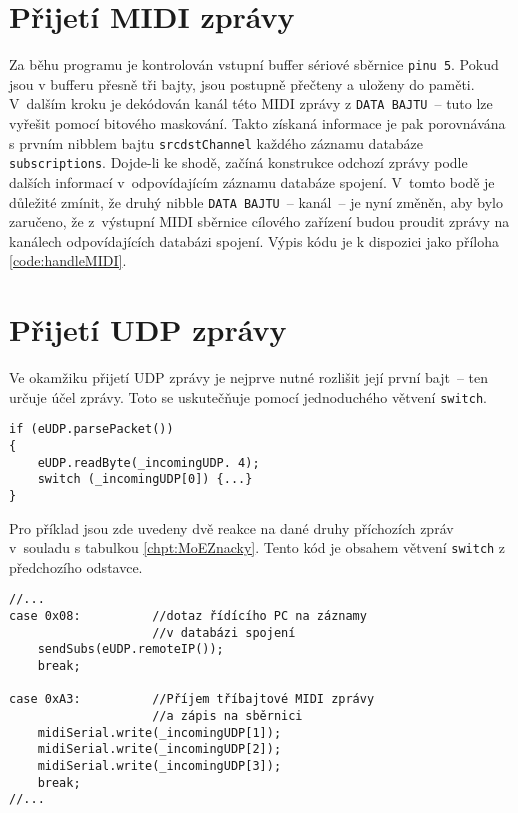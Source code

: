 \section{Přijetí \acs{MIDI} zprávy}\label{chpt:PrijMIDI}
Za běhu programu je kontrolován vstupní buffer sériové sběrnice \texttt{pinu~5}. Pokud jsou v bufferu přesně tři bajty, jsou postupně přečteny a uloženy do paměti. V~dalším kroku je dekódován kanál této \acs{MIDI} zprávy z \texttt{DATA BAJTU}~-- tuto  lze vyřešit pomocí bitového maskování. Takto získaná informace je pak porovnávána s prvním nibblem bajtu \texttt{srcdstChannel} každého záznamu databáze \texttt{sub\-scrip\-tions}. Dojde-li ke shodě, začíná konstrukce odchozí zprávy podle dalších informací v~odpovídajícím záznamu databáze spojení. V~tomto bodě je důležité zmínit, že druhý nibble \texttt{DATA BAJTU}~-- kanál~-- je nyní změněn, aby bylo zaručeno, že z~výstupní \acs{MIDI} sběrnice cílového zařízení budou proudit zprávy na kanálech odpovídajících databázi spojení. Výpis kódu je k dispozici jako příloha \ref{code:handleMIDI}.

\section{Přijetí UDP zprávy}
Ve okamžiku přijetí \acs{UDP} zprávy je nejprve nutné rozlišit její první bajt~-- ten určuje účel zprávy. Toto se uskutečňuje pomocí jednoduchého větvení \texttt{switch}.
\begin{lstlisting}
if (eUDP.parsePacket())
{
    eUDP.readByte(_incomingUDP. 4);
    switch (_incomingUDP[0]) {...}
}
\end{lstlisting}

Pro příklad jsou zde uvedeny dvě reakce na dané druhy příchozích zpráv v~souladu s tabulkou \ref{chpt:MoEZnacky}. Tento kód je obsahem větvení \texttt{switch} z předchozího odstavce.
\begin{lstlisting}
//...
case 0x08:          //dotaz řídícího PC na záznamy 
                    //v databázi spojení
    sendSubs(eUDP.remoteIP());
    break;

case 0xA3:          //Příjem tříbajtové MIDI zprávy 
                    //a zápis na sběrnici
    midiSerial.write(_incomingUDP[1]);
    midiSerial.write(_incomingUDP[2]);
    midiSerial.write(_incomingUDP[3]);
    break;
//...
\end{lstlisting}
